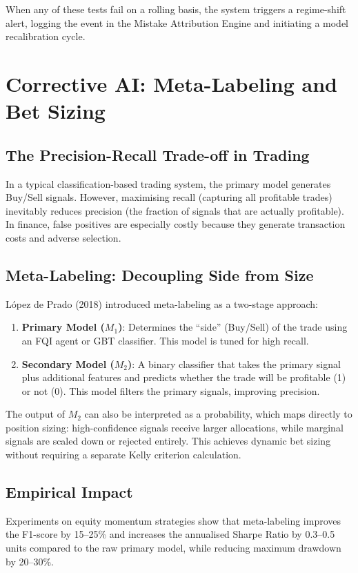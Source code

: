 \documentclass[conference]{IEEEtran}
\begin{document}
When any of these tests fail on a rolling basis, the system triggers a regime-shift alert, logging the event in the Mistake Attribution Engine and initiating a model recalibration cycle.

\section{Corrective AI: Meta-Labeling and Bet Sizing}

\subsection{The Precision-Recall Trade-off in Trading}
In a typical classification-based trading system, the primary model generates Buy/Sell signals. However, maximising recall (capturing all profitable trades) inevitably reduces precision (the fraction of signals that are actually profitable). In finance, false positives are especially costly because they generate transaction costs and adverse selection.

\subsection{Meta-Labeling: Decoupling Side from Size}
L\'{o}pez de Prado (2018) introduced meta-labeling as a two-stage approach:
\begin{enumerate}[nosep]
    \item \textbf{Primary Model ($M_1$)}: Determines the ``side'' (Buy/Sell) of the trade using an FQI agent or GBT classifier. This model is tuned for high recall.
    \item \textbf{Secondary Model ($M_2$)}: A binary classifier that takes the primary signal plus additional features and predicts whether the trade will be profitable (1) or not (0). This model filters the primary signals, improving precision.
\end{enumerate}

The output of $M_2$ can also be interpreted as a probability, which maps directly to position sizing: high-confidence signals receive larger allocations, while marginal signals are scaled down or rejected entirely. This achieves dynamic bet sizing without requiring a separate Kelly criterion calculation.

\subsection{Empirical Impact}
Experiments on equity momentum strategies show that meta-labeling improves the F1-score by 15--25\% and increases the annualised Sharpe Ratio by 0.3--0.5 units compared to the raw primary model, while reducing maximum drawdown by 20--30\%.
\end{document}
